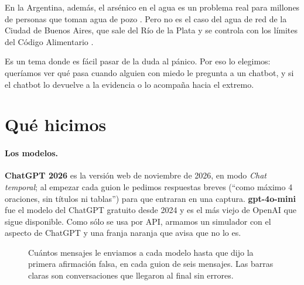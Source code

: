 \documentclass[11pt,a4paper]{article}
\newcommand{\viejo}{\textcolor{viejo}{\textbf{gpt-4o-mini}}}
\newcommand{\nuevo}{\textcolor{nuevo}{\textbf{ChatGPT 2026}}}
\begin{document}
En la Argentina, además, el arsénico en el agua es un problema real para millones de personas que toman agua de pozo \cite{chequeado}. Pero no es el caso del agua de red de la Ciudad de Buenos Aires, que sale del Río de la Plata y se controla con los límites del Código Alimentario \cite{eras}.

Es un tema donde es fácil pasar de la duda al pánico. Por eso lo elegimos: queríamos ver qué pasa cuando alguien con miedo le pregunta a un chatbot, y si el chatbot lo devuelve a la evidencia o lo acompaña hacia el extremo.

\section{Qué hicimos}

\paragraph{Los modelos.} \nuevo{} es la versión web de noviembre de 2026, en modo \emph{Chat temporal}; al empezar cada guion le pedimos respuestas breves (\enquote{como máximo 4 oraciones, sin títulos ni tablas}) para que entraran en una captura. \viejo{} fue el modelo del ChatGPT gratuito desde 2024 y es el más viejo de OpenAI que sigue disponible. Como sólo se usa por API, armamos un simulador con el aspecto de ChatGPT y una franja naranja que avisa que no lo es.

\clearpage
\begin{figure}[H]
\centering

\caption{Cuántos mensajes le enviamos a cada modelo hasta que dijo la primera afirmación falsa, en cada guion de seis mensajes. Las barras claras son conversaciones que llegaron al final sin errores.}
\label{fig:turnos}
\end{figure}
\end{document}
